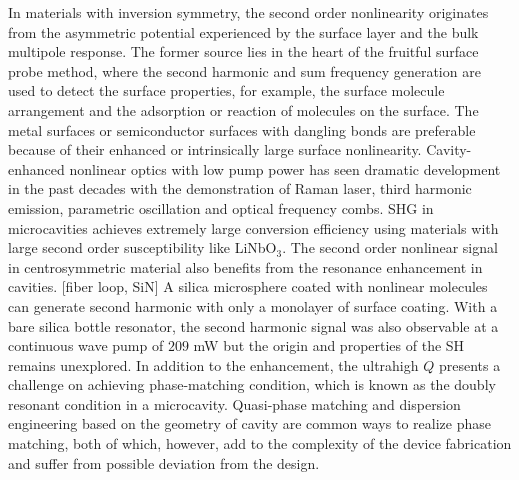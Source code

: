 \documentclass[a4paper,8pt,hyperref, twocolumn]{article}
\begin{document}
In materials with inversion symmetry, the second order nonlinearity originates from the asymmetric potential experienced by the surface layer and the bulk multipole response. 
The former source lies in the heart of the fruitful surface probe method, where the second harmonic and sum frequency generation are used to detect the surface properties, for example, the surface molecule arrangement and the adsorption or reaction of molecules on the surface. The metal surfaces or semiconductor surfaces with dangling bonds are preferable because of their enhanced or intrinsically large surface nonlinearity.
Cavity-enhanced nonlinear optics with low pump power has seen dramatic development in the past decades with the demonstration of Raman laser, third harmonic emission, parametric oscillation and optical frequency combs. 
SHG in microcavities achieves extremely large conversion efficiency using materials with large second order susceptibility like LiNbO$_3$. 
The second order nonlinear signal in centrosymmetric material also benefits from the resonance enhancement in cavities. [fiber loop, SiN]
A silica microsphere coated with nonlinear molecules can generate second harmonic with only a monolayer of surface coating.
With a bare silica bottle resonator, the second harmonic signal was also observable at a continuous wave pump of $209$ mW but the origin and properties of the SH remains unexplored.
In addition to the enhancement, the ultrahigh $Q$ presents a challenge on achieving phase-matching condition, which is known as the doubly resonant condition in a microcavity.
Quasi-phase matching and dispersion engineering based on the geometry of cavity are common ways to realize phase matching, both of which, however, add to the complexity of the device fabrication and suffer from possible deviation from the design.
\end{document}
